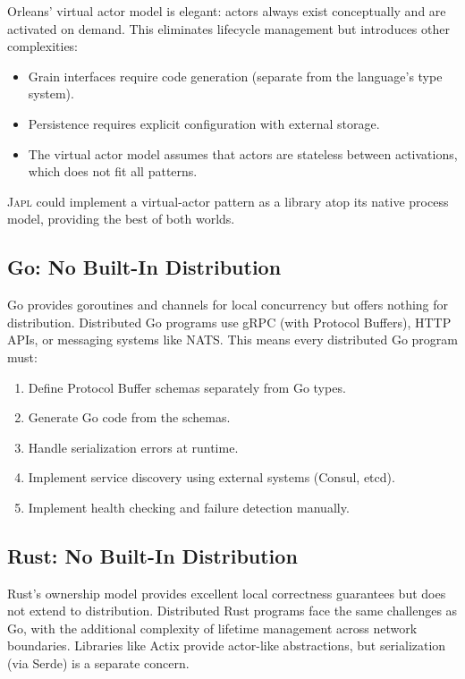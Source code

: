 \documentclass[11pt,a4paper]{article}
\newcommand{\japl}{\textsc{Japl}}
\begin{document}
Orleans' virtual actor model is elegant: actors always exist conceptually
and are activated on demand. This eliminates lifecycle management but
introduces other complexities:

\begin{itemize}[nosep]
  \item Grain interfaces require code generation (separate from the
        language's type system).
  \item Persistence requires explicit configuration with external storage.
  \item The virtual actor model assumes that actors are stateless between
        activations, which does not fit all patterns.
\end{itemize}

\japl{} could implement a virtual-actor pattern as a library atop its
native process model, providing the best of both worlds.

\subsection{Go: No Built-In Distribution}

Go provides goroutines and channels for local concurrency but offers nothing
for distribution. Distributed Go programs use gRPC (with Protocol Buffers),
HTTP APIs, or messaging systems like NATS. This means every distributed Go
program must:

\begin{enumerate}[nosep]
  \item Define Protocol Buffer schemas separately from Go types.
  \item Generate Go code from the schemas.
  \item Handle serialization errors at runtime.
  \item Implement service discovery using external systems (Consul, etcd).
  \item Implement health checking and failure detection manually.
\end{enumerate}

\subsection{Rust: No Built-In Distribution}

Rust's ownership model provides excellent local correctness guarantees but
does not extend to distribution. Distributed Rust programs face the same
challenges as Go, with the additional complexity of lifetime management
across network boundaries. Libraries like Actix provide actor-like
abstractions, but serialization (via Serde) is a separate concern.
\end{document}
